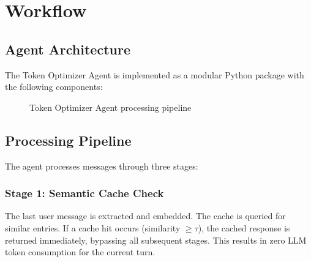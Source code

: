 \section{Workflow}
\label{sec:workflow}

\subsection{Agent Architecture}

The Token Optimizer Agent is implemented as a modular Python package with the following components:

\begin{figure}[H]
\centering
{}
\caption{Token Optimizer Agent processing pipeline}
\label{fig:pipeline}
\end{figure}

\subsection{Processing Pipeline}

The agent processes messages through three stages:

\subsubsection{Stage 1: Semantic Cache Check}

The last user message is extracted and embedded. The cache is queried for similar entries. If a cache hit occurs (similarity $\geq \tau$), the cached response is returned immediately, bypassing all subsequent stages. This results in zero LLM token consumption for the current turn.

